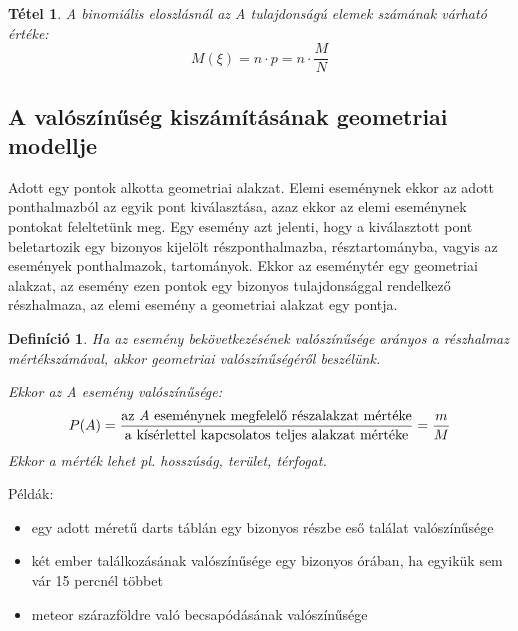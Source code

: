 \documentclass[12pt,a4paper]{article}
\newtheorem{theorem}{Tétel} [section]
\newtheorem{definition}{Definíció} [section]
\begin{document}
\begin{theorem}
A binomiális eloszlásnál az A tulajdonságú elemek számának várható értéke:
\[M(\xi)=n\cdot p=n\cdot\dfrac{M}{N}\]
\end{theorem}
\subsection{A valószínűség kiszámításának geometriai modellje}
Adott egy pontok alkotta geometriai alakzat. Elemi eseménynek ekkor az adott ponthalmazból az egyik pont kiválasztása, azaz ekkor az elemi eseménynek pontokat feleltetünk meg. Egy esemény azt jelenti, hogy a kiválasztott pont beletartozik egy bizonyos kijelölt részponthalmazba, résztartományba, vagyis az események ponthalmazok, tartományok. Ekkor az eseménytér egy geometriai alakzat, az esemény ezen pontok egy bizonyos tulajdonsággal rendelkező részhalmaza, az elemi esemény a geometriai alakzat egy pontja.

\begin{definition}
Ha az esemény bekövetkezésének valószínűsége arányos a részhalmaz mértékszámával, akkor geometriai valószínűségéről beszélünk.

Ekkor az A esemény valószínűsége:
\[P(A)=\dfrac{\text{\normalfont az \textit{A} eseménynek megfelelő részalakzat mértéke}}{\text{\normalfont a kísérlettel kapcsolatos teljes alakzat mértéke}}=\dfrac{m}{M}\]
Ekkor a mérték lehet pl. hosszúság, terület, térfogat.
\end{definition}
Példák:
\begin{itemize}
\item egy adott méretű darts táblán egy bizonyos részbe eső találat valószínűsége
\item két ember találkozásának valószínűsége egy bizonyos órában, ha egyikük sem vár 15 percnél többet
\item  meteor szárazföldre való becsapódásának valószínűsége
\end{itemize}
\end{document}
